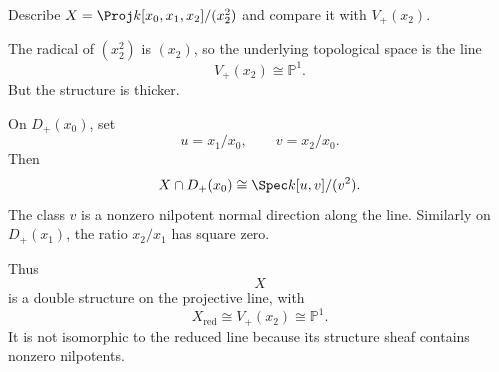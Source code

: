 \begin{problem}\label{prob:vi37-09}
Describe \(X=\Proj k[x_0,x_1,x_2]/(x_2^2)\) and compare it with \(V_+(x_2)\).
\end{problem}

\ifdefined\FullProblemDossiers
\begin{solution}
The radical of \((x_2^2)\) is \((x_2)\), so the underlying topological space is the line
\[
V_+(x_2)\cong\mathbb P^1.
\]
But the structure is thicker.

On \(D_+(x_0)\), set
\[
u=x_1/x_0,\qquad v=x_2/x_0.
\]
Then
\[
X\cap D_+(x_0)
\cong
\Spec k[u,v]/(v^2).
\]
The class \(v\) is a nonzero nilpotent normal direction along the line. Similarly on \(D_+(x_1)\), the ratio \(x_2/x_1\) has square zero.

Thus
\[
\boxed{
X
}
\]
is a double structure on the projective line, with
\[
X_{\mathrm{red}}\cong V_+(x_2)\cong\mathbb P^1.
\]
It is not isomorphic to the reduced line because its structure sheaf contains nonzero nilpotents.
\end{solution}
\fi
